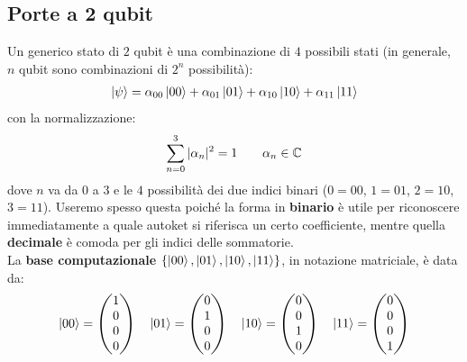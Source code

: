 \documentclass[../../InformazioneQuantistica.tex]{subfiles}
\begin{document}
\subsection{Porte a 2 qubit}
Un generico stato di $2$ qubit è una combinazione di $4$ possibili stati (in generale, $n$ qubit sono combinazioni di $2^n$ possibilità):
\begin{align*}
\Ket{\psi} = \alpha_{00}\Ket{00} + \alpha_{01}\Ket{01} + \alpha_{10}\Ket{10} + \alpha_{11} \Ket{11}
\end{align*}
con la normalizzazione:
\begin{align*}
\sum_{n=0}^3 |\alpha_n|^2 = 1 \qquad \alpha_{n} \in \mathbb{C}
\end{align*}
dove $n$ va da $0$ a $3$ e  le $4$ possibilità dei due indici binari ($0=00$, $1=01$, $2=10$, $3=11$). Useremo spesso questa  poiché la forma in \textbf{binario} è utile per riconoscere immediatamente a quale autoket si riferisca un certo coefficiente, mentre quella \textbf{decimale} è comoda per gli indici delle sommatorie.\\

La \textbf{base computazionale} $\{\Ket{00}, \Ket{01}, \Ket{10}, \Ket{11}\}$, in notazione matriciale, è data da:
\begin{align*}
\Ket{00} = \begin{pmatrix}1 \\ 0 \\ 0 \\ 0 \end{pmatrix} \quad
\Ket{01} = \begin{pmatrix}0 \\ 1 \\ 0 \\ 0 \end{pmatrix} \quad
\Ket{10} = \begin{pmatrix}0 \\ 0 \\ 1 \\ 0 \end{pmatrix} \quad
\Ket{11} = \begin{pmatrix}0 \\ 0 \\ 0 \\ 1 \end{pmatrix}
\end{align*}
\end{document}
